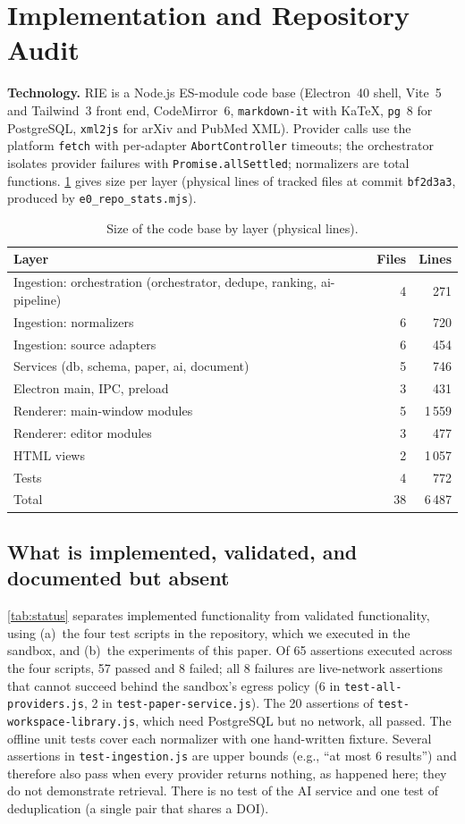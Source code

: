 \documentclass[conference]{IEEEtran}
\newcommand{\code}[1]{\texttt{\small #1}}
\newcommand{\RIE}{RIE}
\begin{document}
\section{Implementation and Repository Audit}
\label{sec:impl}

\textbf{Technology.} \RIE{} is a Node.js ES-module code base (Electron~40 shell, Vite~5 and Tailwind~3 front end, CodeMirror~6, \code{markdown-it} with KaTeX, \code{pg}~8 for PostgreSQL, \code{xml2js} for arXiv and PubMed XML). Provider calls use the platform \code{fetch} with per-adapter \code{AbortController} timeouts; the orchestrator isolates provider failures with \code{Promise.allSettled}; normalizers are total functions. \cref{tab:loc} gives size per layer (physical lines of tracked files at commit \code{bf2d3a3}, produced by \code{e0\_repo\_stats.mjs}).

\begin{table}[t]
\centering
\caption{Size of the code base by layer (physical lines).}
\label{tab:loc}
\footnotesize
\begin{tabular}{@{}p{5.6cm} r r@{}}
\toprule
Layer & Files & Lines \\
\midrule
Ingestion: orchestration (orchestrator, dedupe, ranking, ai-pipeline) & 4 & 271 \\
Ingestion: normalizers & 6 & 720 \\
Ingestion: source adapters & 6 & 454 \\
Services (db, schema, paper, ai, document) & 5 & 746 \\
Electron main, IPC, preload & 3 & 431 \\
Renderer: main-window modules & 5 & 1\,559 \\
Renderer: editor modules & 3 & 477 \\
HTML views & 2 & 1\,057 \\
Tests & 4 & 772 \\
\midrule
Total & 38 & 6\,487 \\
\bottomrule
\end{tabular}
\end{table}

\subsection{What is implemented, validated, and documented but absent}
\cref{tab:status} separates implemented functionality from validated functionality, using (a)~the four test scripts in the repository, which we executed in the sandbox, and (b)~the experiments of this paper. Of 65 assertions executed across the four scripts, 57 passed and 8 failed; all 8 failures are live-network assertions that cannot succeed behind the sandbox's egress policy (6 in \code{test-all-providers.js}, 2 in \code{test-paper-service.js}). The 20 assertions of \code{test-workspace-library.js}, which need PostgreSQL but no network, all passed. The offline unit tests cover each normalizer with one hand-written fixture. Several assertions in \code{test-ingestion.js} are upper bounds (e.g., ``at most 6 results'') and therefore also pass when every provider returns nothing, as happened here; they do not demonstrate retrieval. There is no test of the AI service and one test of deduplication (a single pair that shares a DOI).
\end{document}
